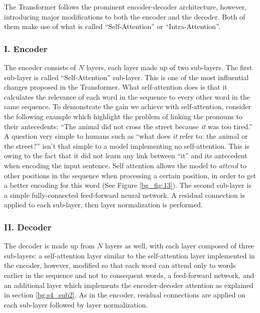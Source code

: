 The Transformer follows the prominent encoder-decoder architecture, however, introducing major modifications to both the encoder and the decoder. Both of them make use of what is called \enquote{Self-Attention} or \enquote{Intra-Attention}.


\subsubsection{I. Encoder} 
\label{bg:s4_sub3_subsub2}

The encoder consists of $N$ layers, each layer made up of two sub-layers. The first sub-layer is called  \enquote{Self-Attention} sub-layer. This is one of the most influential changes proposed in the Transformer. 
What self-attention does is that it calculates the relevance of each word in the sequence to every other word in the same sequence. 
To demonstrate the gain we achieve with self-attention, consider the following example which highlight the problem of linking the pronouns to their antecedents: \enquote{The animal did not cross the street because \textit{it} was too tired.} A question very simple to humans such as \enquote{what does \textit{it} refer to: the animal or the street?} isn't that simple to a model implementing no self-attention. 
This is owing to the fact that it did not learn any link between \enquote{it} and its antecedent when encoding the input sentence.
Self attention allows the model to \textit{attend} to other positions in the sequence when processing a certain position, in order to get a better encoding for this word (See Figure \ref{bg_fig:13}). 
The second sub-layer is a simple fully-connected feed-forward neural network. A residual connection \cite{he2016deep} is applied to each sub-layer, then layer normalization \cite{ba2016layer} is performed.




\subsubsection{II. Decoder} 
\label{bg:s4_sub3_subsub3}

The decoder is made up from $N$ layers as well, with each layer composed of three sub-layers: a self-attention layer similar to the self-attention layer implemented in the encoder, however, modified so that each word can attend only to words earlier in the sequence and not to consequent words, a feed-forward network, and an additional layer which implements the encoder-decoder attention as explained in section \ref{bg:s4_sub2}. As in the encoder, residual connections are applied on each sub-layer followed by layer normalization.



